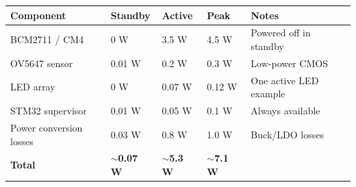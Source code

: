 \begin{longtable}{L{4cm}L{2cm}L{2cm}L{2cm}L{4cm}}
\toprule
\textbf{Component} & \textbf{Standby} & \textbf{Active} & \textbf{Peak} & \textbf{Notes} \\
\midrule
BCM2711 / CM4 & 0 W & 3.5 W & 4.5 W & Powered off in standby \\
OV5647 sensor & 0.01 W & 0.2 W & 0.3 W & Low-power CMOS \\
LED array & 0 W & 0.07 W & 0.12 W & One active LED example \\
STM32 supervisor & 0.01 W & 0.05 W & 0.1 W & Always available \\
Power conversion losses & 0.03 W & 0.8 W & 1.0 W & Buck/LDO losses \\
\midrule
\textbf{Total} & \textbf{$\sim$0.07 W} & \textbf{$\sim$5.3 W} & \textbf{$\sim$7.1 W} & \\
\bottomrule
\end{longtable}
